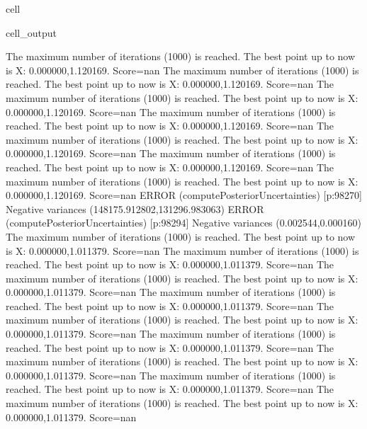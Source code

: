 \documentclass[letterpaper,10pt,english]{jupyterBook}
\begin{document}
\begin{sphinxuseclass}{cell}
\begin{sphinxVerbatimOutput}
\begin{sphinxuseclass}{cell_output}
\begin{sphinxVerbatim}[commandchars=\\\{\}]
The maximum number of iterations (1000) is reached. The best point up to now is X: \PYGZob{}0.000000,\PYGZhy{}1.120169\PYGZcb{}. Score=\PYGZhy{}nan
The maximum number of iterations (1000) is reached. The best point up to now is X: \PYGZob{}0.000000,\PYGZhy{}1.120169\PYGZcb{}. Score=\PYGZhy{}nan
The maximum number of iterations (1000) is reached. The best point up to now is X: \PYGZob{}0.000000,\PYGZhy{}1.120169\PYGZcb{}. Score=\PYGZhy{}nan
The maximum number of iterations (1000) is reached. The best point up to now is X: \PYGZob{}0.000000,\PYGZhy{}1.120169\PYGZcb{}. Score=\PYGZhy{}nan
The maximum number of iterations (1000) is reached. The best point up to now is X: \PYGZob{}0.000000,\PYGZhy{}1.120169\PYGZcb{}. Score=\PYGZhy{}nan
The maximum number of iterations (1000) is reached. The best point up to now is X: \PYGZob{}0.000000,\PYGZhy{}1.120169\PYGZcb{}. Score=\PYGZhy{}nan
The maximum number of iterations (1000) is reached. The best point up to now is X: \PYGZob{}0.000000,\PYGZhy{}1.120169\PYGZcb{}. Score=\PYGZhy{}nan
ERROR (compute\PYGZus{}Posterior\PYGZus{}Uncertainties) [p:98270] Negative variances (\PYGZhy{}148175.912802,\PYGZhy{}131296.983063)
ERROR (compute\PYGZus{}Posterior\PYGZus{}Uncertainties) [p:98294] Negative variances (0.002544,\PYGZhy{}0.000160)
The maximum number of iterations (1000) is reached. The best point up to now is X: \PYGZob{}0.000000,1.011379\PYGZcb{}. Score=\PYGZhy{}nan
The maximum number of iterations (1000) is reached. The best point up to now is X: \PYGZob{}0.000000,1.011379\PYGZcb{}. Score=\PYGZhy{}nan
The maximum number of iterations (1000) is reached. The best point up to now is X: \PYGZob{}0.000000,1.011379\PYGZcb{}. Score=\PYGZhy{}nan
The maximum number of iterations (1000) is reached. The best point up to now is X: \PYGZob{}0.000000,1.011379\PYGZcb{}. Score=\PYGZhy{}nan
The maximum number of iterations (1000) is reached. The best point up to now is X: \PYGZob{}0.000000,1.011379\PYGZcb{}. Score=\PYGZhy{}nan
The maximum number of iterations (1000) is reached. The best point up to now is X: \PYGZob{}0.000000,1.011379\PYGZcb{}. Score=\PYGZhy{}nan
The maximum number of iterations (1000) is reached. The best point up to now is X: \PYGZob{}0.000000,1.011379\PYGZcb{}. Score=\PYGZhy{}nan
The maximum number of iterations (1000) is reached. The best point up to now is X: \PYGZob{}0.000000,1.011379\PYGZcb{}. Score=\PYGZhy{}nan
The maximum number of iterations (1000) is reached. The best point up to now is X: \PYGZob{}0.000000,1.011379\PYGZcb{}. Score=\PYGZhy{}nan

\end{sphinxVerbatim}
\end{sphinxuseclass}
\end{sphinxVerbatimOutput}
\end{sphinxuseclass}
\end{document}
